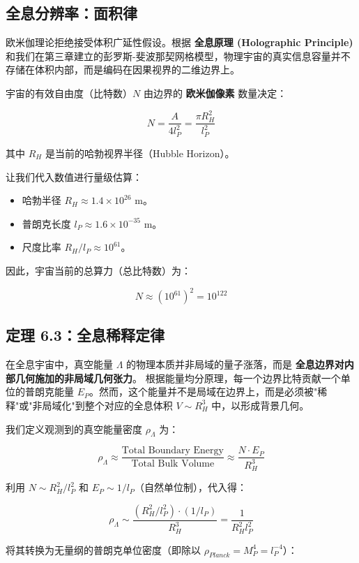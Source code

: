 \subsection{全息分辨率：面积律}

欧米伽理论拒绝接受体积广延性假设。根据 \textbf{全息原理 (Holographic Principle)} 和我们在第三章建立的彭罗斯-斐波那契网格模型，物理宇宙的真实信息容量并不存储在体积内部，而是编码在因果视界的二维边界上。

宇宙的有效自由度（比特数）$N$ 由边界的 \textbf{欧米伽像素} 数量决定：

\[N = \frac{A}{4 l_P^2} = \frac{\pi R_{H}^2}{l_P^2}\]

其中 $R_H$ 是当前的哈勃视界半径（Hubble Horizon）。

让我们代入数值进行量级估算：

\begin{itemize}
\item 哈勃半径 $R_H \approx 1.4 \times 10^{26} \text{ m}$。
\item 普朗克长度 $l_P \approx 1.6 \times 10^{-35} \text{ m}$。
\item 尺度比率 $R_H / l_P \approx 10^{61}$。
\end{itemize}

因此，宇宙当前的总算力（总比特数）为：

\[N \approx (10^{61})^2 = 10^{122}\]

\subsection{定理 6.3：全息稀释定律}

在全息宇宙中，真空能量 $\Lambda$ 的物理本质并非局域的量子涨落，而是 \textbf{全息边界对内部几何施加的非局域几何张力}。
根据能量均分原理，每一个边界比特贡献一个单位的普朗克能量 $E_P$。然而，这个能量并不是局域在边界上，而是必须被"稀释"或"非局域化"到整个对应的全息体积 $V \sim R_H^3$ 中，以形成背景几何。

我们定义观测到的真空能量密度 $\rho_{\Lambda}$ 为：

\[\rho_{\Lambda} \approx \frac{\text{Total Boundary Energy}}{\text{Total Bulk Volume}} \approx \frac{N \cdot E_P}{R_H^3}\]

利用 $N \sim R_H^2/l_P^2$ 和 $E_P \sim 1/l_P$（自然单位制），代入得：

\[\rho_{\Lambda} \sim \frac{(R_H^2/l_P^2) \cdot (1/l_P)}{R_H^3} = \frac{1}{R_H^2 l_P^2}\]

将其转换为无量纲的普朗克单位密度（即除以 $\rho_{Planck} = M_P^4 = l_P^{-4}$）：

